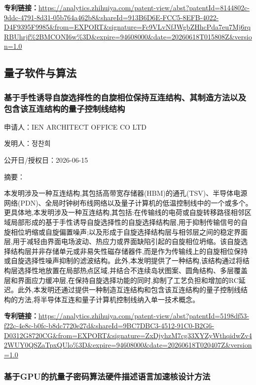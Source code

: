 \documentclass[12pt,a4paper]{ctexart}
\begin{document}
\noindent\textbf{专利链接：}\url{https://analytics.zhihuiya.com/patent-view/abst?patentId=8144802c-9ddc-4791-8d31-05b764a462b8&shareId=913B6D6E-FCC5-8EFB-4022-D4F9395F9985&from=EXPORT&signature=Fc9VLvNfJWgbZHhcPda7eu7Mj6rqRBUhrjf%2BMCONI6w%3D&expire=94608000&date=20260618T015808Z&version=1.0}


\subsection{ 量子软件与算法 }

\subsubsection{ 基于手性诱导自旋选择性的自旋相位保持互连结构、其制造方法以及包含该互连结构的量子控制线结构 }

申请人：IEN ARCHITECT OFFICE CO LTD

发明人：정찬희

公开日/授权日：2026-06-15

摘要：

本发明涉及一种互连结构,其包括高带宽存储器(HBM)的通孔(TSV)、半导体电源网络(PDN)、全局时钟树布线网络以及量子计算机的低温控制线中的一个或多个。更具体地,本发明涉及一种互连结构,其包括:在传输线的电荷或自旋转移路径相邻区域局部形成的基于手性诱导自旋选择性的自旋选择结构层,用于抑制传输信号的自旋相位坍缩或自旋偏置噪声;以及形成于自旋选择结构层与相邻层之间的稳定界面层,用于减轻由界面电场波动、热应力或界面缺陷引起的自旋相位坍缩。该自旋选择结构层并非存储单元或非易失性磁存储器件,而是作为传输线上的自旋相位保持或自旋选择性噪声抑制的滤波结构。此外,本发明提供了一种结构,该结构通过将结构层选择性地放置在局部热点区域,并结合不连续岛状图案、圆角结构、多层覆盖层和界面应力缓冲层,在保持自旋选择功能的同时,抑制了工艺负担和增加的RC延迟。此外,本发明还通过提供一种制造互连结构和包含该互连结构的量子控制线结构的方法,将半导体互连和量子计算机控制线纳入单一技术概念。

\noindent\textbf{专利链接：}\url{https://analytics.zhihuiya.com/patent-view/abst?patentId=5198df53-f22c-4e8c-b0fc-b8dc7720e27d&shareId=9BC7DBC3-4512-91C0-B2G6-D0312G8720CG&from=EXPORT&signature=ZxDjyhzM7cg33XYZyWthqidwZv42WUY0QSZaTpxQUlo%3D&expire=94608000&date=20260618T020407Z&version=1.0}

\subsubsection{ 基于GPU的抗量子密码算法硬件描述语言加速核设计方法 }
\end{document}
